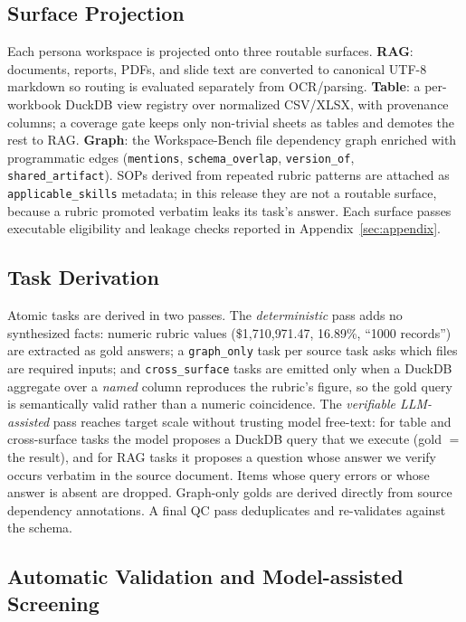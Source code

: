 \documentclass[11pt]{article}
\begin{document}
\subsection{Surface Projection}
\label{sec:surfaces}
Each persona workspace is projected onto three routable surfaces.
\textbf{RAG}: documents, reports, PDFs, and slide text are converted to
canonical UTF-8 markdown so routing is evaluated separately from OCR/parsing.
\textbf{Table}: a per-workbook DuckDB view registry over normalized CSV/XLSX,
with provenance columns; a coverage gate keeps only non-trivial sheets as
tables and demotes the rest to RAG. \textbf{Graph}: the Workspace-Bench file
dependency graph enriched with programmatic edges (\texttt{mentions},
\texttt{schema\_overlap}, \texttt{version\_of}, \texttt{shared\_artifact}).
SOPs derived from repeated rubric patterns are attached as
\texttt{applicable\_skills} metadata; in this release they are not a routable surface,
because a rubric promoted verbatim leaks its task's answer. Each surface passes
executable eligibility and leakage checks reported in
Appendix~\ref{sec:appendix}.

\subsection{Task Derivation}
\label{sec:derivation}
Atomic tasks are derived in two passes. The \emph{deterministic} pass adds no
synthesized facts: numeric rubric values ($\$$1{,}710{,}971.47, 16.89\%,
``1000 records'') are extracted as gold answers; a \texttt{graph\_only} task
per source task asks which files are required inputs; and \texttt{cross\_surface}
tasks are emitted only when a DuckDB aggregate over a \emph{named} column
reproduces the rubric's figure, so the gold query is semantically valid rather
than a numeric coincidence. The \emph{verifiable LLM-assisted} pass reaches
target scale without trusting model free-text: for table and cross-surface
tasks the model proposes a DuckDB query that we execute (gold $=$ the result),
and for RAG tasks it proposes a question whose answer we verify occurs verbatim
in the source document. Items whose query errors or whose answer is absent are
dropped. Graph-only golds are derived directly from source dependency
annotations. A final QC pass deduplicates and re-validates against the schema.

\subsection{Automatic Validation and Model-assisted Screening}
\label{sec:qc}
\end{document}
